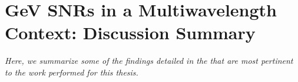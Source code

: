 



\section{GeV SNRs in a Multiwavelength Context: Discussion Summary}\label{snrcat:resSum}
\emph{Here, we summarize some of the findings detailed in the \snrcat{} that are most pertinent to the work performed for this thesis.} 

